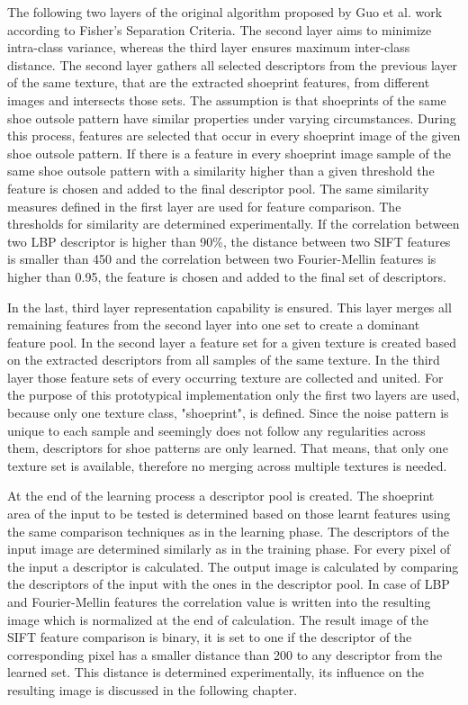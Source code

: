\documentclass[draft,final]{vutinfth} %
\begin{document}
\par
The following two layers of the original algorithm proposed by Guo et al. \cite{guo2012discriminative}  work according to Fisher's Separation Criteria.
The second layer aims to minimize intra-class variance, whereas the third layer ensures maximum inter-class distance. 
The second layer gathers all selected descriptors from the previous layer of the same texture, that are the extracted shoeprint features, from different images and intersects those sets.
The assumption is that shoeprints of the same shoe outsole pattern have similar properties under varying circumstances.
During this process, features are selected that occur in every shoeprint image of the given shoe outsole pattern.
If there is a feature in every shoeprint image sample of the same shoe outsole pattern with a similarity higher than a given threshold the feature is chosen and added to the final descriptor pool.
The same similarity measures defined in the first layer are used for feature comparison.
The thresholds for similarity are determined experimentally.
If the correlation between two LBP descriptor is higher than 90\%, the distance between two SIFT features is smaller than 450 and the correlation between two Fourier-Mellin features is higher than 0.95, the feature is chosen and added to the final set of descriptors.
\par
In the last, third layer representation capability is ensured.
This layer merges all remaining features from the second layer into one set to create a dominant feature pool.
In the second layer a feature set for a given texture is created based on the extracted descriptors from all samples of the same texture.
In the third layer those feature sets of every occurring texture are collected and united.
For the purpose of this prototypical implementation only the first two layers are used, because only one texture class, "shoeprint", is defined.
Since the noise pattern is unique to each sample and seemingly does not follow any regularities across them, descriptors for shoe patterns are only learned.
That means, that only one texture set is available, therefore no merging across multiple textures is needed.
\par
At the end of the learning process a descriptor pool is created.
The shoeprint area of the input to be tested is determined based on those learnt features using the same comparison techniques as in the learning phase.
The descriptors of the input image are determined similarly as in the training phase.
For every pixel of the input a descriptor is calculated.
The output image is calculated by comparing the descriptors of the input with the ones in the descriptor pool.
In case of LBP and Fourier-Mellin features the correlation value is written into the resulting image which is normalized at the end of calculation.
The result image of the SIFT feature comparison is binary, it is set to one if the descriptor of the corresponding pixel has a smaller distance than 200 to any descriptor from the learned set.
This distance is determined experimentally, its influence on the resulting image is discussed in the following chapter.
\end{document}
